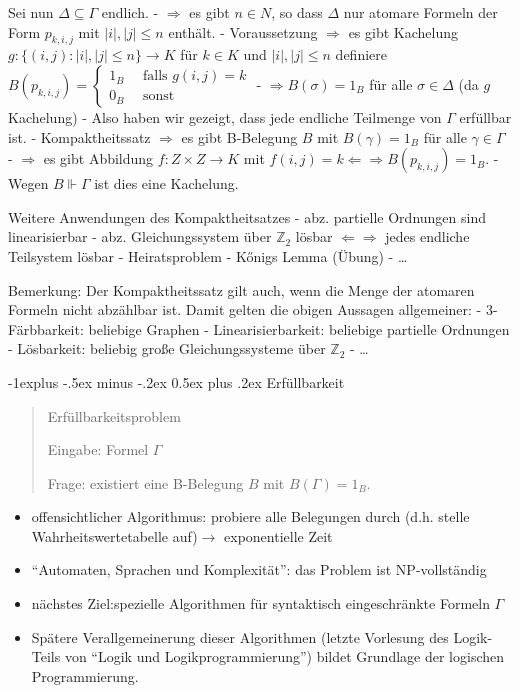 \documentclass[a4paper]{article}
\makeatletter
\renewcommand{\subsection}{\@startsection{subsection}{2}{0mm}%
                {-1explus -.5ex minus -.2ex}%
                {0.5ex plus .2ex}%
                {\normalfont\normalsize\bfseries}}
\makeatother
\begin{document}
\begin{multicols}{3}
  Sei nun $\Delta\subseteq\Gamma$ endlich. - $\Rightarrow$ es gibt
  $n\in N$, so dass $\Delta$ nur atomare Formeln der Form $p_{k,i,j}$ mit
  $|i|,|j|\leq n$ enthält. - Voraussetzung $\Rightarrow$ es gibt Kachelung
  $g:\{(i,j) :|i|,|j| \leq n\}\rightarrow K$ für $k\in K$ und
  $|i|,|j|\leq n$ definiere
  $B(p_{k,i,j}) = \begin{cases} 1_B \quad\text{ falls } g(i,j) =k \\ 0_B \quad\text{ sonst} \end{cases}$
  - $\Rightarrow B(\sigma) = 1_B$ für alle $\sigma\in\Delta$ (da $g$
  Kachelung) - Also haben wir gezeigt, dass jede endliche Teilmenge von
  $\Gamma$ erfüllbar ist. - Kompaktheitssatz $\Rightarrow$ es gibt
  B-Belegung $B$ mit $B(\gamma) = 1_B$ für alle $\gamma\in\Gamma$ -
  $\Rightarrow$ es gibt Abbildung $f:Z\times Z\rightarrow K$ mit
  $f(i,j) =k \Leftarrow\Rightarrow B(p_{k,i,j}) = 1_B$. - Wegen
  $B\Vdash\Gamma$ ist dies eine Kachelung.

  Weitere Anwendungen des Kompaktheitsatzes - abz. partielle Ordnungen
  sind linearisierbar - abz. Gleichungssystem über $\mathbb{Z}_2$ lösbar
  $\Leftarrow\Rightarrow$ jedes endliche Teilsystem lösbar -
  Heiratsproblem - Kőnigs Lemma (Übung) - \ldots{}

  Bemerkung: Der Kompaktheitssatz gilt auch, wenn die Menge der atomaren
  Formeln nicht abzählbar ist. Damit gelten die obigen Aussagen
  allgemeiner: - 3-Färbbarkeit: beliebige Graphen - Linearisierbarkeit:
  beliebige partielle Ordnungen - Lösbarkeit: beliebig große
  Gleichungssysteme über $\mathbb{Z}_2$ - \ldots{}

  \subsection{Erfüllbarkeit}\label{erfuxfcllbarkeit}

  \begin{quote}
    Erfüllbarkeitsproblem

    Eingabe: Formel $\Gamma$

    Frage: existiert eine B-Belegung $B$ mit $B(\Gamma) = 1_B$.
  \end{quote}

  \begin{itemize}
    \itemsep1pt\parskip0pt
    \item
          offensichtlicher Algorithmus: probiere alle Belegungen durch (d.h.
          stelle Wahrheitswertetabelle auf)$\rightarrow$ exponentielle Zeit
    \item
          ``Automaten, Sprachen und Komplexität'': das Problem ist
          NP-vollständig
    \item
          nächstes Ziel:spezielle Algorithmen für syntaktisch eingeschränkte
          Formeln $\Gamma$
    \item
          Spätere Verallgemeinerung dieser Algorithmen (letzte Vorlesung des
          Logik-Teils von ``Logik und Logikprogrammierung'') bildet Grundlage
          der logischen Programmierung.
  \end{itemize}


\end{multicols}
\end{document}
